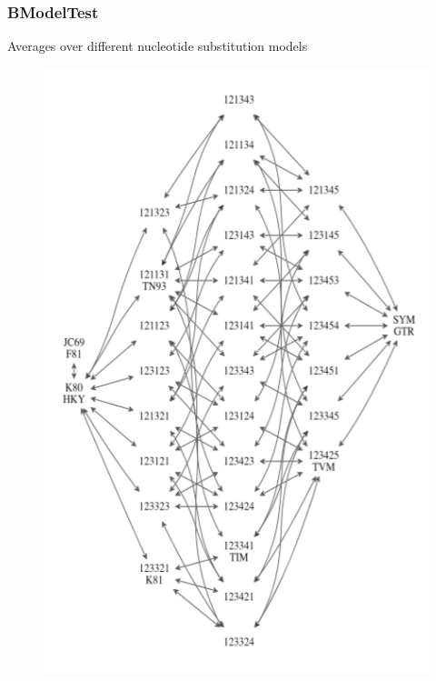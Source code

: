 \begin{frame}\frametitle{BModelTest}

  Averages over different nucleotide substitution models

  \begin{figure}
      \includegraphics[height=0.7\textheight]{figures/BModelTest}
  \end{figure}

\end{frame}

